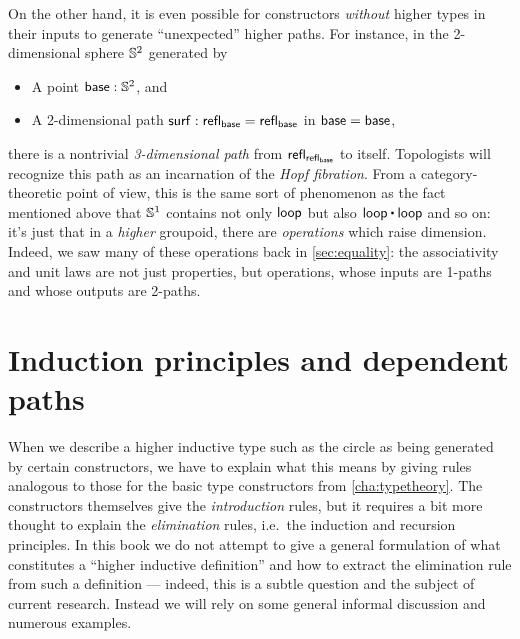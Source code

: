 On the other hand, it is even possible for constructors \emph{without} higher types in their inputs to generate ``unexpected'' higher paths.
For instance, in the 2-dimensional sphere $\mathbb{S}^2$ generated by
%
\begin{itemize}
\item A point $\mathsf{base}:\mathbb{S}^2$, and
\item A 2-dimensional path $\mathsf{surf}:\mathsf{refl}_{\mathsf{base}} = \mathsf{refl}_{\mathsf{base}}$ in ${\mathsf{base}=\mathsf{base}}$,
\end{itemize}
there is a nontrivial \emph{3-dimensional path} from $\mathsf{refl}_{\mathsf{refl}_{\mathsf{base}}}$ to itself.
Topologists will recognize this path as an incarnation of the \emph{Hopf fibration}.
From a category-theoretic point of view, this is the same sort of phenomenon as the fact mentioned above that $\mathbb{S}^1$ contains not only $\mathsf{loop}$ but also $\lloop\ct\lloop$ and so on: it's just that in a \emph{higher} groupoid, there are \emph{operations} which raise dimension.
Indeed, we saw many of these operations back in \cref{sec:equality}: the associativity and unit laws are not just properties, but operations, whose inputs are 1-paths and whose outputs are 2-paths.

%

\vspace*{0pt plus 20ex}

\section{Induction principles and dependent paths}
\label{sec:dependent-paths}

When we describe a higher inductive type such as the circle as being generated by certain constructors, we have to explain what this means by giving rules analogous to those for the basic type constructors from \cref{cha:typetheory}.
The constructors themselves give the \emph{introduction} rules, but it requires a bit more thought to explain the \emph{elimination} rules, i.e.\ the induction and recursion principles.
In this book we do not attempt to give a general formulation of what constitutes a ``higher inductive definition'' and how to extract the elimination rule from such a definition --- indeed, this is a subtle question and the subject of current research.
Instead we will rely on some general informal discussion and numerous examples.

